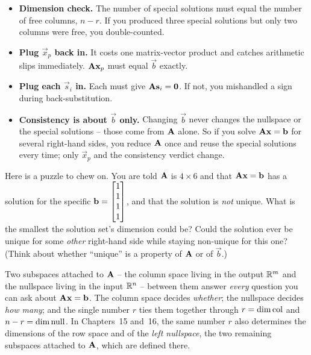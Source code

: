 \begin{itemize}
  \item \textbf{Dimension check.} The number of special solutions must equal the number of
    free columns, $n-r$. If you produced three special solutions but only two columns were
    free, you double-counted.
  \item \textbf{Plug $\vec{x}_p$ back in.} It costs one matrix-vector product and catches
    arithmetic slips immediately. $\mathbf{A}\mathbf{x}_p$ must equal $\vec{b}$ exactly.
  \item \textbf{Plug each $\vec{s}_i$ in.} Each must give $\mathbf{A}\mathbf{s}_i=\mathbf{0}$. If
    not, you mishandled a sign during back-substitution.
  \item \textbf{Consistency is about $\vec{b}$ only.} Changing $\vec{b}$ never changes the
    nullspace or the special solutions -- those come from $\mathbf{A}$ alone. So if you solve
    $\mathbf{A}\mathbf{x}=\mathbf{b}$ for several right-hand sides, you reduce $\mathbf{A}$ once and
    reuse the special solutions every time; only $\vec{x}_p$ and the consistency verdict
    change.
\end{itemize}

\begin{walkbox}
Here is a puzzle to chew on. You are told $\mathbf{A}$ is $4\times6$ and that
$\mathbf{A}\mathbf{x}=\mathbf{b}$ has a solution for the specific $\mathbf{b}=\begin{bmatrix}1\\1\\1\\1\end{bmatrix}$, and
that the solution is \emph{not} unique. What is the smallest the solution set's dimension
could be? Could the solution ever be unique for some \emph{other} right-hand side while
staying non-unique for this one? (Think about whether ``unique'' is a property of
$\mathbf{A}$ or of $\vec{b}$.)
\end{walkbox}

\begin{aestheticbox}
Two subspaces attached to $\mathbf{A}$ -- the column space living in the output $\mathbb{R}^m$ and
the nullspace living in the input $\mathbb{R}^n$ -- between them answer \emph{every} question you
can ask about $\mathbf{A}\mathbf{x}=\mathbf{b}$. The column space decides \emph{whether}; the
nullspace decides \emph{how many}; and the single number $r$ ties them together through
$r=\dim\operatorname{col}$ and $n-r=\dim\operatorname{null}$. In Chapters~15 and~16, the same number $r$ also
determines the dimensions of the row space and of the \emph{left nullspace}, the two remaining
subspaces attached to $\mathbf{A}$, which are defined there.
\end{aestheticbox}

